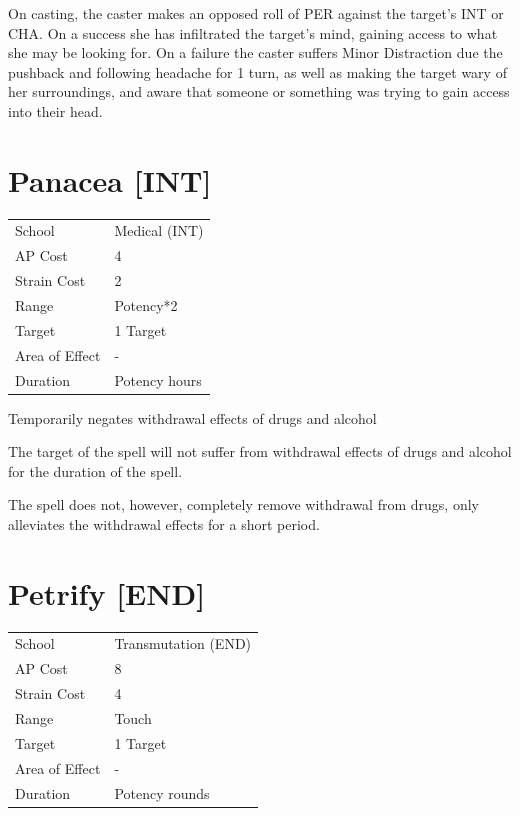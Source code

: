 \documentclass[11pt,a4paper,twocolumn]{book}
\begin{document}
On casting, the caster makes an opposed roll of PER against the target's INT or CHA. On a success she has infiltrated the target's mind, gaining access to what she may be looking for. On a failure the caster suffers Minor Distraction due the pushback and following headache for 1 turn, as well as making the target wary of her surroundings, and aware that someone or something was trying to gain access into their head.


\section*{Panacea [INT]}
{
	\begin{tabu} to 75mm{| X[l,4] | X[l,7] |}
		\hline
		School 			& Medical (INT) 		\\
        AP Cost	      	& 4 					\\
        Strain Cost     & 2 					\\
        Range     		& Potency*2				\\
        Target      	& 1 Target				\\
        Area of Effect  & -  	 				\\
        Duration     	& Potency hours			\\ \hline
	\end{tabu}
		
}

\medskip

Temporarily negates withdrawal effects of drugs and alcohol

The target of the spell will not suffer from withdrawal effects of drugs and alcohol for the duration of the spell.

The spell does not, however, completely remove withdrawal from drugs, only alleviates the withdrawal effects for a short period.


\section*{Petrify [END]}
{
	\begin{tabu} to 75mm{| X[l,4] | X[l,7] |}
		\hline
		School 			& Transmutation (END) 	\\
        AP Cost	      	& 8 					\\
        Strain Cost     & 4 					\\
        Range     		& Touch					\\
        Target      	& 1 Target				\\
        Area of Effect  & -  	 				\\
        Duration     	& Potency rounds		\\ \hline
	\end{tabu}
		
}
\end{document}
